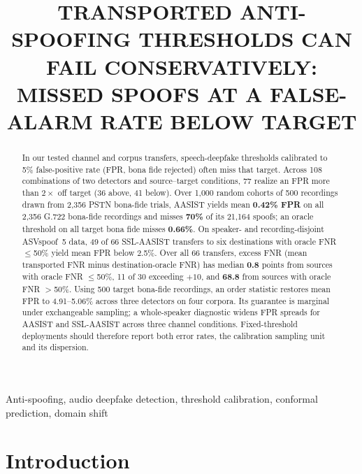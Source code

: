 \documentclass{article}
\title{TRANSPORTED ANTI-SPOOFING THRESHOLDS CAN FAIL CONSERVATIVELY: MISSED SPOOFS AT A FALSE-ALARM RATE BELOW TARGET}
\begin{document}
\maketitle

\begin{abstract}
In our tested channel and corpus transfers, speech-deepfake thresholds calibrated to 5\% false-positive rate (FPR, bona fide rejected) often miss that target. Across 108 combinations of two detectors and source--target conditions, 77 realize an FPR more than $2\times$ off target (36 above, 41 below). Over 1,000 random cohorts of 500 recordings drawn from 2,356 PSTN bona-fide trials, AASIST yields mean \textbf{0.42\% FPR} on all 2,356 G.722 bona-fide recordings and misses \textbf{70\%} of its 21,164 spoofs; an oracle threshold on all target bona fide misses \textbf{0.66\%}. On speaker- and recording-disjoint ASVspoof~5 data, 49 of 66 SSL-AASIST transfers to six destinations with oracle FNR $\le$50\% yield mean FPR below 2.5\%. Over all 66 transfers, excess FNR (mean transported FNR minus destination-oracle FNR) has median \textbf{0.8} points from sources with oracle FNR $\le$50\%, 11 of 30 exceeding $+10$, and \textbf{68.8} from sources with oracle FNR $>$50\%. Using 500 target bona-fide recordings, an order statistic restores mean FPR to 4.91--5.06\% across three detectors on four corpora. Its guarantee is marginal under exchangeable sampling; a whole-speaker diagnostic widens FPR spreads for AASIST and SSL-AASIST across three channel conditions. Fixed-threshold deployments should therefore report both error rates, the calibration sampling unit and its dispersion.
\end{abstract}

\begin{keywords}
Anti-spoofing, audio deepfake detection, threshold calibration, conformal prediction, domain shift
\end{keywords}

\section{Introduction}
\label{sec:intro}
\end{document}
